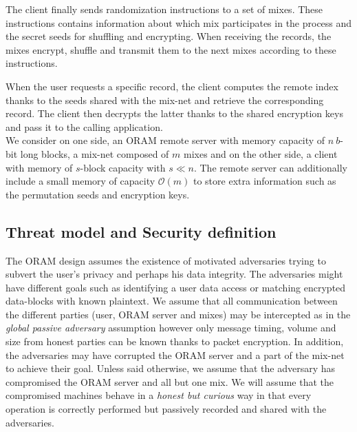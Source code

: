 \documentclass[USenglish,oneside,twocolumn]{article}
\begin{document}
The client finally sends randomization instructions to a set of mixes. These instructions contains information about which mix participates in the process and the secret seeds for shuffling and encrypting. When receiving the records, the mixes encrypt, shuffle and transmit them to the next mixes according to these instructions.

When the user requests a specific record, the client computes the remote index thanks to the seeds shared with the mix-net and retrieve the corresponding record. The client then decrypts the latter thanks to the shared encryption keys and pass it to the calling application.\\

We consider on one side, an ORAM remote server with memory capacity of $n\ b$-bit long blocks, a mix-net composed of $m$ mixes and on the other side, a client with memory of $s$-block capacity with $s\ll n$. The remote server can additionally include a small memory of capacity $\mathcal{O}(m)$ to store extra information such as the permutation seeds and encryption keys.

\subsection{Threat model and Security definition}\label{Threat}

The ORAM design assumes the existence of motivated adversaries trying to subvert the user's privacy and perhaps his data integrity.
The adversaries might have different goals such as identifying a user data access or matching encrypted data-blocks with known plaintext. 
\noindent We assume that all communication between the different parties (user, ORAM server and mixes) may be intercepted as in the \textit{global passive adversary} assumption however only message timing, volume and size from honest parties can be known thanks to packet encryption.
In addition, the adversaries may have corrupted the ORAM server and a part of the mix-net to achieve their goal. Unless said otherwise, we assume that the adversary has compromised the ORAM server and all but one mix.
We will assume that the compromised machines behave in a \textit{honest but curious} way in that every operation is correctly performed but passively recorded and shared with the adversaries.
\end{document}
